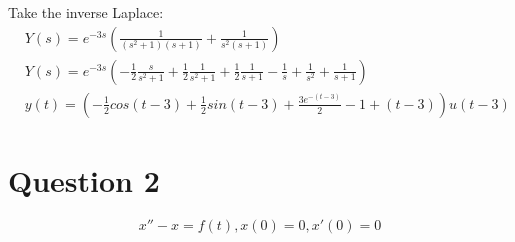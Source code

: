 \documentclass[12pt]{article}
\begin{document}
Take the inverse Laplace:
\begin{align*}
  &Y(s) = e^{-3s}(\frac{1}{(s^2 + 1)(s + 1)} + \frac{1}{s^2(s + 1)})
  \\ &Y(s) = e^{-3s}(-\frac{1}{2}\frac{s}{s^2 + 1} + \frac{1}{2}\frac{1}{s^2 + 1} + \frac{1}{2}\frac{1}{s + 1} -\frac{1}{s} + \frac{1}{s^2} + \frac{1}{s + 1})
  \\ &y(t) = (-\frac{1}{2}cos(t - 3) + \frac{1}{2}sin(t - 3) + \frac{3e^{-(t-3)}}{2} - 1 + (t - 3))u(t - 3)
\end{align*}

\section*{Question 2}
$$x'' - x = f(t), x(0) = 0, x'(0) = 0$$
\end{document}
